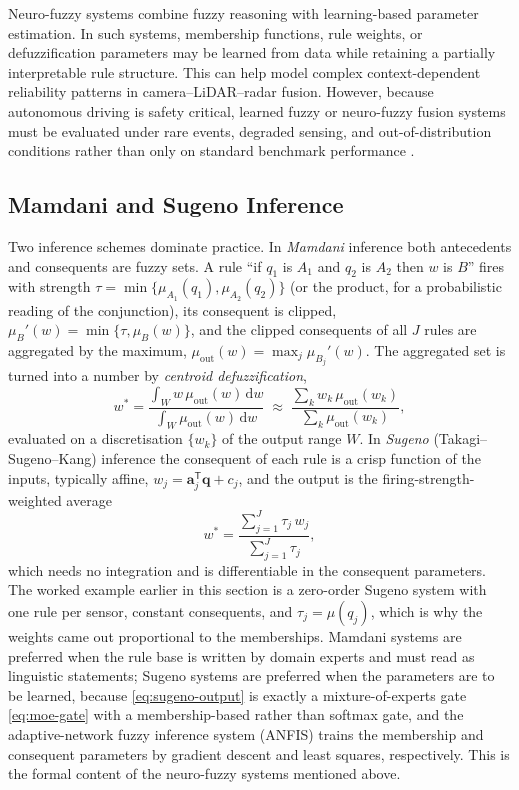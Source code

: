 Neuro-fuzzy systems combine fuzzy reasoning with learning-based parameter estimation. In such systems, membership functions, rule weights, or defuzzification parameters may be learned from data while retaining a partially interpretable rule structure. This can help model complex context-dependent reliability patterns in camera--LiDAR--radar fusion. However, because autonomous driving is safety critical, learned fuzzy or neuro-fuzzy fusion systems must be evaluated under rare events, degraded sensing, and out-of-distribution conditions rather than only on standard benchmark performance \cite{khaleghi_multisensor_2013, baltrusaitis_multimodal_2019}.

\subsection{Mamdani and Sugeno Inference}
\label{subsec:mamdani-sugeno}
Two inference schemes dominate practice. In \emph{Mamdani} inference \cite{mamdani1975_fuzzy} both antecedents and consequents are fuzzy sets. A rule ``if $q_1$ is $A_1$ and $q_2$ is $A_2$ then $w$ is $B$'' fires with strength $\tau=\min\{\mu_{A_1}(q_1),\mu_{A_2}(q_2)\}$ (or the product, for a probabilistic reading of the conjunction), its consequent is clipped, $\mu_{B}'(w)=\min\{\tau,\mu_{B}(w)\}$, and the clipped consequents of all $J$ rules are aggregated by the maximum, $\mu_{\mathrm{out}}(w)=\max_j\mu_{B_j}'(w)$. The aggregated set is turned into a number by \emph{centroid defuzzification},
\begin{equation}
w^{\ast}=\frac{\displaystyle\int_{W} w\,\mu_{\mathrm{out}}(w)\,\mathrm{d}w}{\displaystyle\int_{W}\mu_{\mathrm{out}}(w)\,\mathrm{d}w}
\;\approx\;
\frac{\sum_{k} w_k\,\mu_{\mathrm{out}}(w_k)}{\sum_{k}\mu_{\mathrm{out}}(w_k)},
\label{eq:centroid-defuzzification}
\end{equation}
evaluated on a discretisation $\{w_k\}$ of the output range $W$. In \emph{Sugeno} (Takagi--Sugeno--Kang) inference \cite{takagi1985_sugeno} the consequent of each rule is a crisp function of the inputs, typically affine, $w_j=\mathbf{a}_j^{\mathsf T}\mathbf{q}+c_j$, and the output is the firing-strength-weighted average
\begin{equation}
w^{\ast}=\frac{\sum_{j=1}^{J}\tau_j\,w_j}{\sum_{j=1}^{J}\tau_j},
\label{eq:sugeno-output}
\end{equation}
which needs no integration and is differentiable in the consequent parameters. The worked example earlier in this section is a zero-order Sugeno system with one rule per sensor, constant consequents, and $\tau_j=\mu(q_j)$, which is why the weights came out proportional to the memberships. Mamdani systems are preferred when the rule base is written by domain experts and must read as linguistic statements; Sugeno systems are preferred when the parameters are to be learned, because \eqref{eq:sugeno-output} is exactly a mixture-of-experts gate \eqref{eq:moe-gate} with a membership-based rather than softmax gate, and the adaptive-network fuzzy inference system (ANFIS) \cite{jang1993_anfis} trains the membership and consequent parameters by gradient descent and least squares, respectively. This is the formal content of the neuro-fuzzy systems mentioned above.

